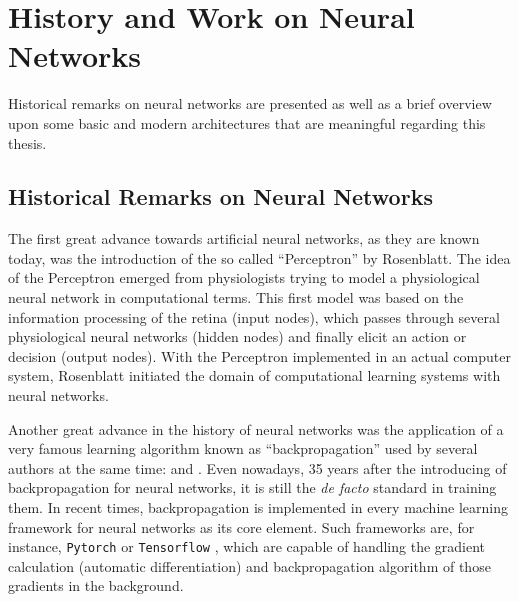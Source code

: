 
\section{History and Work on Neural Networks}\label{sec:prev_nn}
Historical remarks on neural networks are presented as well as a brief overview upon some basic and modern architectures that are meaningful regarding this thesis.



\subsection{Historical Remarks on Neural Networks}\label{sec:prev_nn_history}
The first great advance towards artificial neural networks, as they are known today, was the introduction of the so called \enquote{Perceptron} \cite{Rosenblatt1958} by Rosenblatt. 
The idea of the Perceptron emerged from physiologists trying to model a physiological neural network in computational terms. 
This first model was based on the information processing of the retina (input nodes), which passes through several physiological neural networks (hidden nodes) and finally elicit an action or decision (output nodes).
With the Perceptron implemented in an actual computer system, Rosenblatt initiated the domain of computational learning systems with neural networks.

Another great advance in the history of neural networks was the application of a very famous learning algorithm known as \enquote{backpropagation} used by several authors at the same time: \cite{LeCun1986} and \cite{Rumelhart1986}.
Even nowadays, 35 years after the introducing of backpropagation for neural networks, it is still the \emph{de facto} standard in training them.
In recent times, backpropagation is implemented in every machine learning framework for neural networks as its core element.
Such frameworks are, for instance, \texttt{Pytorch} \cite{Pytorch} or \texttt{Tensorflow} \cite{Tensorflow}, which are capable of handling the gradient calculation (automatic differentiation) and backpropagation algorithm of those gradients in the background.

